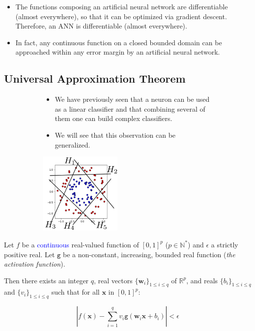 \documentclass{book}
\newcommand{\x}{\mathbf{x}}
\newcommand{\act}{\texttt{g}}%
\newcommand{\R}{\mathbb{R}}
\newcommand{\N}{\mathbb{N}}
\begin{document}
\begin{itemize}
\item The functions composing an artificial neural network are differentiable (almost everywhere), so that it can be optimized via gradient descent. Therefore, an ANN is differentiable (almost everywhere).
\item In fact, any continuous function on a closed bounded domain can be approached within any error margin by an artificial neural network.
\end{itemize}

\subsection{Universal Approximation Theorem}

\begin{figure}[h]
    \centering
    \begin{subfigure}{.5\textwidth}
        \begin{itemize}
        \item We have previously seen that a neuron can be used as a linear classifier and that combining several of them one can build complex classifiers.
        \item We will see that this observation can be generalized.
        \end{itemize}
    \end{subfigure}
    \begin{subfigure}{.5\textwidth}
        \includegraphics[height=4cm]{circles_H}
    \end{subfigure}
\end{figure}

\begin{block}{}
Let $f$ be a \textcolor{blue}{continuous} real-valued function of $[0,1]^p$ ($p \in \N^*$) and $\epsilon$ a strictly positive real. Let $\act$ be a non-constant, increasing, bounded real function (\emph{\small{the activation function}}).

Then there exists an integer $q$, real vectors $\{\mathbf{w}_i\}_{1 \leq i \leq q}$ of $\R^p$, and reals $\{b_i\}_{1 \leq i \leq q}$ and $\{v_i\}_{1 \leq i \leq q}$ such that for all $\x$ in $[0,1]^p$:

\[
\left| f(\x) - \sum\limits_{i=1}^q v_i \act(\mathbf{w}_i\x + b_i) \right| < \epsilon
\]
\end{block}
\end{document}
